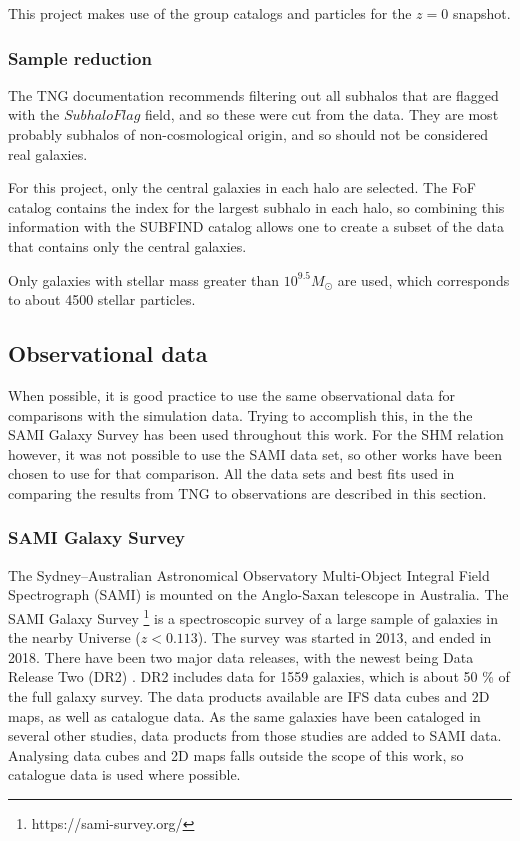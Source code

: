This project makes use of the group catalogs and particles for the $z = 0$ snapshot.

\subsubsection{Sample reduction}

The TNG documentation recommends filtering out all subhalos that are flagged with the $SubhaloFlag$ field, and so these were cut from the data. They are most probably subhalos of non-cosmological origin, and so should not be considered real galaxies.

For this project, only the central galaxies in each halo are selected. The FoF catalog contains the index for the largest subhalo in each halo, so combining this information with the SUBFIND catalog allows one to create a subset of the data that contains only the central galaxies.

Only galaxies with stellar mass greater than $10^{9.5} M_{\odot}$ are used, which corresponds to about 4500 stellar particles.

\subsection{Observational data}
When possible, it is good practice to use the same observational data for comparisons with the simulation data. Trying to accomplish this, in the the SAMI Galaxy Survey \parencite{Bryant2015} has been used throughout this work. For the SHM relation however, it was not possible to use the SAMI data set, so other works have been chosen to use for that comparison. All the data sets and best fits used in comparing the results from TNG to observations are described in this section.

\subsubsection{SAMI Galaxy Survey}
The Sydney–Australian Astronomical Observatory Multi-Object Integral Field Spectrograph (SAMI) is mounted on the Anglo-Saxan telescope in Australia. The SAMI Galaxy Survey \footnote{https://sami-survey.org/} is a spectroscopic survey of a large sample of galaxies in the nearby Universe ($z < 0.113$). The survey was started in 2013, and ended in 2018. There have been two major data releases, with the newest being Data Release Two (DR2) \parencite{Scott2018}. DR2 includes data for 1559 galaxies, which is about 50 \% of the full galaxy survey. The data products available are IFS data cubes and 2D maps, as well as catalogue data. As the same galaxies have been cataloged in several other studies, data products from those studies are added to SAMI data. Analysing data cubes and 2D maps falls outside the scope of this work, so catalogue data is used where possible. 

